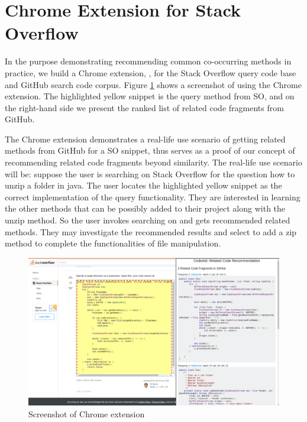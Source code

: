 \section{Chrome Extension for Stack Overflow}
\label{sec:chrome}

In the purpose demonstrating recommending common co-occurring methods in practice, we build a Chrome extension, {\tool}, for the Stack Overflow query code base and GitHub search code corpus. Figure \ref{fig:chrome} shows a screenshot of using the Chrome extension. The highlighted yellow snippet is the query method from SO, and on the right-hand side we present the ranked list of related code fragments from GitHub. 

The Chrome extension demonstrates a real-life use scenario of getting related methods from GitHub for a SO snippet, thus serves as a proof of our concept of recommending related code fragments beyond similarity.
The real-life use scenario will be: suppose the user is searching on Stack Overflow for the question {\ttt how to unzip a folder in java}. The user locates the highlighted yellow snippet as the correct implementation of the query functionality. They are interested in learning the other methods that can be possibly added to their project along with the {\ttt unzip} method. So the user invokes searching on {\tool} and gets recommended related methods. They may investigate the recommended results and select to add a {\ttt zip} method to complete the functionalities of file manipulation. 

\begin{figure}[!h]
	\includegraphics[width=\linewidth]{figures/ui.png}
	\caption{Screenshot of Chrome extension}
	\label{fig:chrome}
\end{figure}

